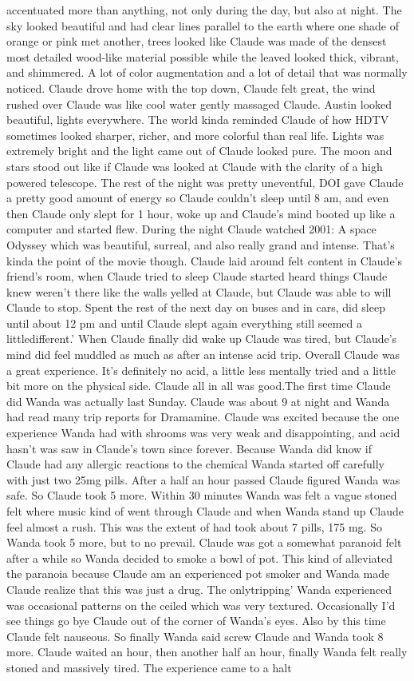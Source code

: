 \documentclass[12pt]{book}
\begin{document}
accentuated more than anything, not only during the day, but also at night. The sky looked beautiful and had clear lines parallel to the earth where one shade of orange or pink met another, trees looked like Claude was made of the densest most detailed wood-like material possible while the leaved looked thick, vibrant, and shimmered. A lot of color augmentation and a lot of detail that was normally noticed. Claude drove home with the top down, Claude felt great, the wind rushed over Claude was like cool water gently massaged Claude. Austin looked beautiful, lights everywhere. The world kinda reminded Claude of how HDTV sometimes looked sharper, richer, and more colorful than real life. Lights was extremely bright and the light came out of Claude looked pure. The moon and stars stood out like if Claude was looked at Claude with the clarity of a high powered telescope. The rest of the night was pretty uneventful, DOI gave Claude a pretty good amount of energy so Claude couldn't sleep until 8 am, and even then Claude only slept for 1 hour, woke up and Claude's mind booted up like a computer and started flew. During the night Claude watched 2001: A space Odyssey which was beautiful, surreal, and also really grand and intense. That's kinda the point of the movie though. Claude laid around felt content in Claude's friend's room, when Claude tried to sleep Claude started heard things Claude knew weren't there like the walls yelled at Claude, but Claude was able to will Claude to stop. Spent the rest of the next day on buses and in cars, did sleep until about 12 pm and until Claude slept again everything still seemed a littledifferent.' When Claude finally did wake up Claude was tired, but Claude's mind did feel muddled as much as after an intense acid trip. Overall Claude was a great experience. It's definitely no acid, a little less mentally tried and a little bit more on the physical side. Claude all in all was good.The first time Claude did Wanda was actually last Sunday. Claude was about 9 at night and Wanda had read many trip reports for Dramamine. Claude was excited because the one experience Wanda had with shrooms was very weak and disappointing, and acid hasn't was saw in Claude's town since forever. Because Wanda did know if Claude had any allergic reactions to the chemical Wanda started off carefully with just two 25mg pills. After a half an hour passed Claude figured Wanda was safe. So Claude took 5 more. Within 30 minutes Wanda was felt a vague stoned felt where music kind of went through Claude and when Wanda stand up Claude feel almost a rush. This was the extent of had took about 7 pills, 175 mg. So Wanda took 5 more, but to no prevail. Claude was got a somewhat paranoid felt after a while so Wanda decided to smoke a bowl of pot. This kind of alleviated the paranoia because Claude am an experienced pot smoker and Wanda made Claude realize that this was just a drug. The onlytripping' Wanda experienced was occasional patterns on the ceiled which was very textured. Occasionally I'd see things go bye Claude out of the corner of Wanda's eyes. Also by this time Claude felt nauseous. So finally Wanda said screw Claude and Wanda took 8 more. Claude waited an hour, then another half an hour, finally Wanda felt really stoned and massively tired. The experience came to a halt 
\end{document}

